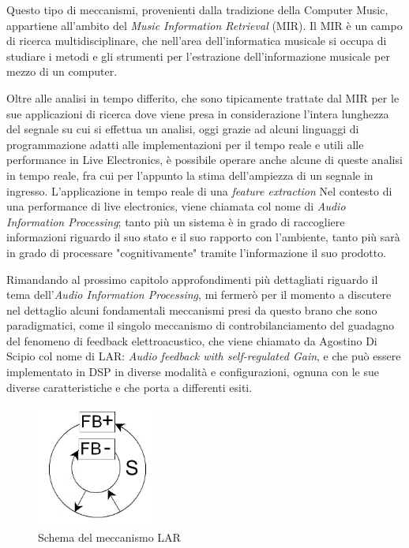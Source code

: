 Questo tipo di meccanismi, provenienti dalla tradizione della Computer Music, appartiene 
all'ambito del \textit{Music Information Retrieval} (MIR).
Il MIR è un campo di ricerca multidisciplinare, che nell'area dell’informatica musicale si occupa di
studiare i metodi e gli strumenti per l’estrazione dell’informazione musicale per mezzo di un
computer.

Oltre alle analisi in tempo differito, che sono tipicamente trattate dal MIR
per le sue applicazioni di ricerca dove viene presa in considerazione
l’intera lunghezza del segnale su cui si effettua un analisi, 
oggi grazie ad alcuni linguaggi di programmazione
adatti alle implementazioni per il tempo reale e utili alle
performance in Live Electronics, è possibile operare anche alcune
di queste analisi in tempo reale, fra cui per l'appunto la stima dell'ampiezza
di un segnale in ingresso.
L'applicazione in tempo reale di una \textit{feature extraction} 
Nel contesto di una performance di live electronics, viene chiamata col nome di
\textit{Audio Information Processing};
tanto più un sistema è in grado di raccogliere informazioni riguardo
il suo stato e il suo rapporto con l'ambiente, tanto più sarà in grado di
processare "cognitivamente" tramite l'informazione il suo prodotto.

Rimandando al prossimo capitolo approfondimenti più dettagliati riguardo il tema 
dell'\textit{Audio Information Processing}, mi fermerò per il momento a discutere 
nel dettaglio alcuni fondamentali meccanismi presi da questo brano che sono paradigmatici,
come il singolo meccanismo di controbilanciamento del guadagno
del fenomeno di feedback elettroacustico, che viene chiamato da Agostino Di Scipio col nome di 
LAR: \textit{Audio feedback with self-regulated Gain},
e che può essere implementato in DSP in diverse modalità e configurazioni,
ognuna con le sue diverse caratteristiche e che porta a differenti esiti.

\begin{figure}[h!]
\begin{center}
\vspace{0.25cm}
\includegraphics[width=4cm]{figures/controlled_larsen_Feedback.png}
\caption{Schema del meccanismo LAR}
\vspace{0.5cm}
\end{center}
\end{figure} 

